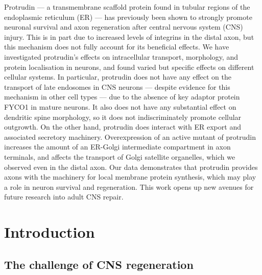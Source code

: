 \documentclass[
  12pt,
  a4paper,
]{book}
\begin{document}
Protrudin --- a transmembrane scaffold protein found in tubular regions of the endoplasmic reticulum (ER) --- has previously been shown to strongly promote neuronal survival and axon regeneration after central nervous system (CNS) injury. This is in part due to increased levels of integrins in the distal axon, but this mechanism does not fully account for its beneficial effects. We have investigated protrudin's effects on intracellular transport, morphology, and protein localisation in neurons, and found varied but specific effects on different cellular systems. In particular, protrudin does not have any effect on the transport of late endosomes in CNS neurons --- despite evidence for this mechanism in other cell types --- due to the absence of key adaptor protein FYCO1 in mature neurons. It also does not have any substantial effect on dendritic spine morphology, so it does not indiscriminately promote cellular outgrowth. On the other hand, protrudin does interact with ER export and associated secretory machinery. Overexpression of an active mutant of protrudin increases the amount of an ER-Golgi intermediate compartment in axon terminals, and affects the transport of Golgi satellite organelles, which we observed even in the distal axon. Our data demonstrates that protrudin provides axons with the machinery for local membrane protein synthesis, which may play a role in neuron survival and regeneration. This work opens up new avenues for future research into adult CNS repair.


\tableofcontents

\hypertarget{INTRODUCTION}{%
\chapter*{Introduction}\label{INTRODUCTION}}



\hypertarget{the-challenge-of-cns-regeneration}{%
\section{The challenge of CNS regeneration}\label{the-challenge-of-cns-regeneration}}
\end{document}
